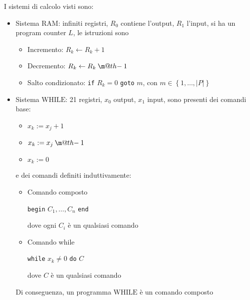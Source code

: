 \documentclass[12pt, answers]{exam}
\makeatletter
\theoremstyle{plain}
\newcommand{\ram}{\text{RAM}}
\newcommand{\while}{\text{WHILE}}
\newcommand{\dotminus}{\mathbin{\text{\@dotminus}}}
\newcommand{\@dotminus}{%
    \ooalign{\hidewidth\raise1ex\hbox{.}\hidewidth\cr$\m@th-$\cr}%
}
\makeatother
\begin{document}
\begin{questions}
        \begin{solution}
            I sistemi di calcolo visti sono: 
            \begin{itemize}
                \item Sistema $\ram$: infiniti registri, $R_0$ contiene l'output, $R_1$ l'input, si ha un program counter $L$, le istruzioni sono
                \begin{itemize}
                    \item Incremento: $R_k \leftarrow R_k + 1$
                    
                    \item Decremento: $R_k \leftarrow R_k \dotminus 1$
                    
                    \item Salto condizionato: \texttt{if} $R_k = 0$ \texttt{goto} $m$, con $m \in \left\{1, \dots, |P|\right\}$
                \end{itemize}
                
                \item Sistema $\while$: 21 registri, $x_0$ output, $x_1$ input, sono presenti dei comandi base: 
                \begin{itemize}
                    \item $x_k := x_j + 1$
                    
                    \item $x_k := x_j \dotminus 1$
                    
                    \item $x_k := 0$
                \end{itemize}
                e dei comandi definiti induttivamente:
                \begin{itemize}
                    \item Comando composto
                    \begin{center}
                        \texttt{begin} $C_1, \dots, C_n$ \texttt{end}
                    \end{center}
                    dove ogni $C_i$ è un qualsiasi comando
                    
                    \item Comando while
                    \begin{center}
                        \texttt{while} $x_k \neq 0$ \texttt{do} $C$
                    \end{center}
                    dove $C$ è un qualsiasi comando
                \end{itemize}
                Di conseguenza, un programma $\while$ è un comando composto
            \end{itemize}
        \end{solution}
        

\end{questions}
\end{document}
